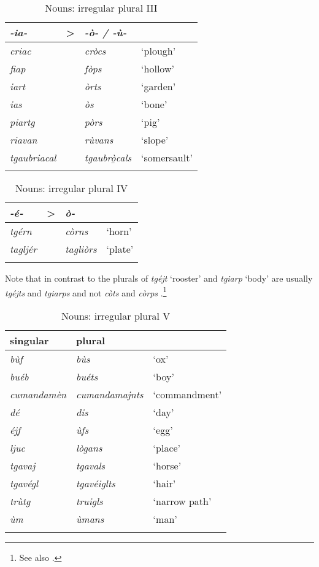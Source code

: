 \begin{table}
\caption{Nouns: irregular plural III} 
\label{irregplIII}
 \begin{tabular}{llll}
  \lsptoprule
   \textit{-ia-} & > & \textit{-ò- / -ù-} \\
  \midrule
\textit{criac} && \textit{cròcs} & `plough'\\
\textit{fiap} && \textit{fòps} & `hollow'\\
\textit{iart}  && \textit{òrts} & `garden'\\
\textit{ias} && \textit{òs} & `bone' \\
\textit{piartg} && \textit{pòrs} & `pig'\\
\textit{riavan} && \textit{rùvans} & `slope'\\
\textit{tgaubriacal} && \textit{tgaubr{\`o̱}cals} & `somersault'  \\
  \lspbottomrule
 \end{tabular}
\end{table}

\begin{table}
	\caption{Nouns: irregular plural IV} 
	\label{irregplIV}
	\begin{tabular}{llll}
		\lsptoprule
		 \textit{-é-} & > & \textit{ò-} & \\
		\midrule
		 \textit{tgérn} & & \textit{còrns} & `horn'\\
		 \textit{tagljér} & & \textit{tagliòrs} & `plate'\\
		\lspbottomrule
	\end{tabular}
\end{table}

Note that in contrast to  the plurals of \textit{tgéjt} `rooster' and \textit{tgiarp} `body' are usually \textit{tgéjts} and \textit{tgiarps} and not \textit{còts} and \textit{còrps} .\footnote{See also .}


\begin{table}
\caption{Nouns: irregular plural V}
\label{irregplV}
 \begin{tabular}{lll}
  \lsptoprule
singular & plural \\
  \midrule
\textit{bùf} & \textit{bùs} & `ox'\\
\textit{buéb} & \textit{buéts} & `boy'\\
\textit{cumandamèn} & \textit{cumandamajnts} & `commandment'\\
\textit{dé} & \textit{dis} & `day'\\
\textit{éjf} & \textit{ùfs} & `egg'\\
\textit{ljuc}  & \textit{lògans} & `place'\\
\textit{tgavaj} & \textit{tgavals} & `horse'\\
\textit{tgavégl} & \textit{tgavéiglts} & `hair'\\ 
\textit{trùtg} & \textit{truigls} & `narrow path'\\
\textit{ùm} & \textit{ùmans} & `man'\\
  \lspbottomrule
 \end{tabular}
\end{table}

